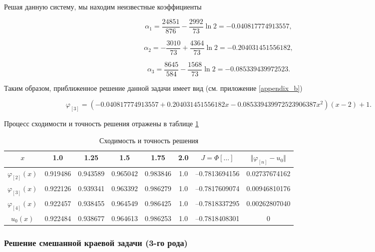 \documentclass{article}
\begin{document}
\noindent Решая данную систему, мы находим неизвестные коэффициенты

\begin{displaymath}
	\alpha_{1} = \frac{24851}{876} - \frac{2992}{73} \ln{2} = -0.040817774913557,
\end{displaymath}

\begin{displaymath}	
	\alpha_{2} = -\frac{3010}{73} + \frac{4364}{73} \ln{2} = -0.204031451556182, 
\end{displaymath}

\begin{displaymath}
	\alpha_{3} = \frac{8645}{584} - \frac{1568}{73} \ln{2} = -0.085339439972523.
\end{displaymath}

Таким образом, приближенное решение данной задачи имеет вид (см. приложение \ref{appendix_b})

\begin{displaymath}	
	\varphi_{[3]} = (-0.040817774913557+0.204031451556182x -0.085339439972523906387x^2)(x-2) + 1.
\end{displaymath}

\noindent Процесс сходимости и точность решения отражены в таблице \ref{table_process_of_convergence_rank_2}

\begin{table}[!h]
\centering
\begin{tabular}{|c|c|c|c|c|c|c|c|}
	\hline
	$x$ & 1.0 & 1.25 & 1.5 & 1.75 & 2.0 & $J = \Phi[\ldots]$ & $\Vert \varphi_{[n]} - u_{0} \Vert$ \\
	\hline \hline

	$\varphi_{[2]}(x)$ & 0.919486 & 0.943589 & 0.965042 & 0.983846 & 1.0 & –0.7813694156 & 0.02737674162 \\	\hline
	$\varphi_{[3]}(x)$ & 0.922126 & 0.939341 & 0.963392 & 0.986279 & 1.0 & –0.7817609074 & 0.00946810176 \\	\hline
	$\varphi_{[4]}(x)$ & 
0.922457 & 0.938455 & 0.964549 & 0.986425 & 1.0 & –0.7818337295 & 0.00262807040 \\	\hline
	$u_{0}(x)$ & 0.922484 & 0.938677 & 0.964613 & 0.986253 & 1.0 & –0.7818408301 & 0 \\	\hline

\end{tabular}
\caption{Сходимость и точность решения}
\label{table_process_of_convergence_rank_2}
\end{table}

\subsubsection{Решение смешанной краевой задачи (3-го рода)}
\end{document}
